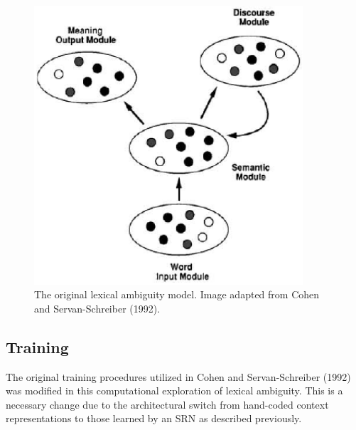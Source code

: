\documentclass[man]{apa}
\begin{document}
\begin{figure}[tp]
\begin{center}
	\includegraphics[width=100mm]{figures/Cohen_ServanSchreiber_Model.eps}
\end{center}
\caption{The original lexical ambiguity model. Image adapted from Cohen and Servan-Schreiber (1992).}
\label{cohen-servan-schreiber-model}
\end{figure} 

\subsection{Training}
The original training procedures utilized in Cohen and Servan-Schreiber (1992) was modified in this computational exploration of lexical ambiguity.  This is a necessary change due to the architectural switch from hand-coded context representations to those learned by an SRN as described previously.  
\end{document}
